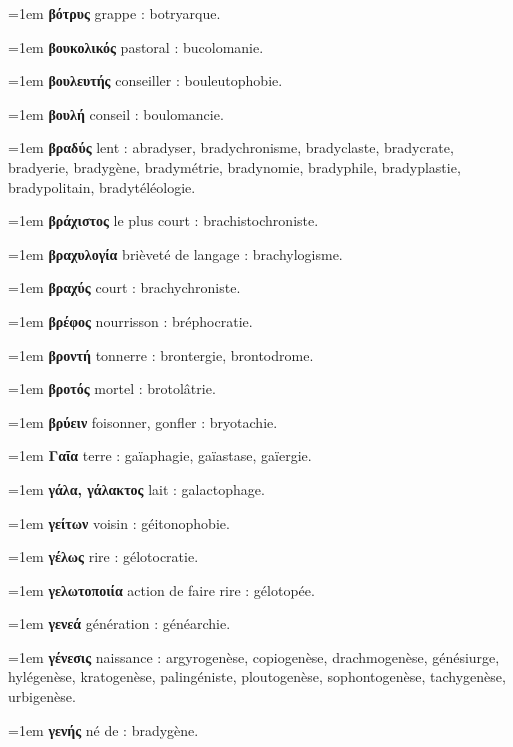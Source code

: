 \hangindent=1em \textbf{βότρυς} grappe : botryarque.\par
\hangindent=1em \textbf{βουκολικός} pastoral : bucolomanie.\par
\hangindent=1em \textbf{βουλευτής} conseiller : bouleutophobie.\par
\hangindent=1em \textbf{βουλή} conseil : boulomancie.\par
\hangindent=1em \textbf{βραδύς} lent : abradyser, bradychronisme, bradyclaste, bradycrate, bradyerie, bradygène, bradymétrie, bradynomie, bradyphile, bradyplastie, bradypolitain, bradytéléologie.\par
\hangindent=1em \textbf{βράχιστος} le plus court : brachistochroniste.\par
\hangindent=1em \textbf{βραχυλογία} brièveté de langage : brachylogisme.\par
\hangindent=1em \textbf{βραχύς} court : brachychroniste.\par
\hangindent=1em \textbf{βρέφος} nourrisson : bréphocratie.\par
\hangindent=1em \textbf{βροντή} tonnerre : brontergie, brontodrome.\par
\hangindent=1em \textbf{βροτός} mortel : brotolâtrie.\par
\hangindent=1em \textbf{βρύειν} foisonner, gonfler : bryotachie.\par
\hangindent=1em \textbf{Γαῖα} terre : gaïaphagie, gaïastase, gaïergie.\par
\hangindent=1em \textbf{γάλα, γάλακτος} lait : galactophage.\par
\hangindent=1em \textbf{γείτων} voisin : géitonophobie.\par
\hangindent=1em \textbf{γέλως} rire : gélotocratie.\par
\hangindent=1em \textbf{γελωτοποιία} action de faire rire : gélotopée.\par
\hangindent=1em \textbf{γενεά} génération : généarchie.\par
\hangindent=1em \textbf{γένεσις} naissance : argyrogenèse, copiogenèse, drachmogenèse, génésiurge, hylégenèse, kratogenèse, palingéniste, ploutogenèse, sophontogenèse, tachygenèse, urbigenèse.\par
\hangindent=1em \textbf{γενής} né de : bradygène.\par
